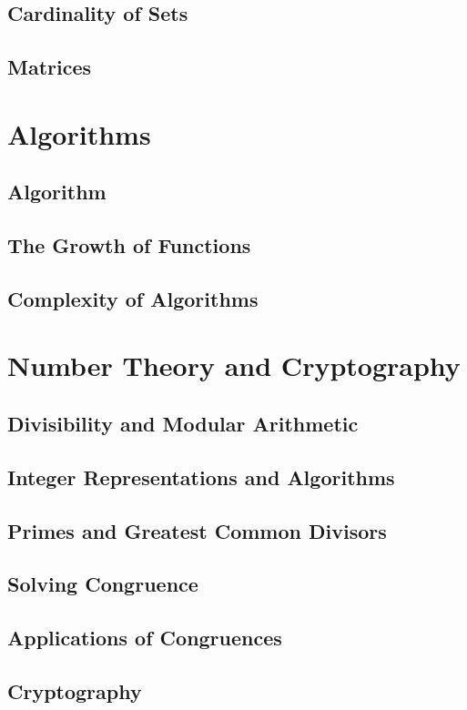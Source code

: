 \documentclass{article}
\begin{document}
\subsection{Cardinality of Sets}
\subsection{Matrices}

\section{Algorithms}

\subsection{Algorithm}
\subsection{The Growth of Functions}
\subsection{Complexity of Algorithms}

\section{Number Theory and Cryptography}

\subsection{Divisibility and Modular Arithmetic}
\subsection{Integer Representations and Algorithms}
\subsection{Primes and Greatest Common Divisors}
\subsection{Solving Congruence}
\subsection{Applications of Congruences}
\subsection{Cryptography}
\end{document}
